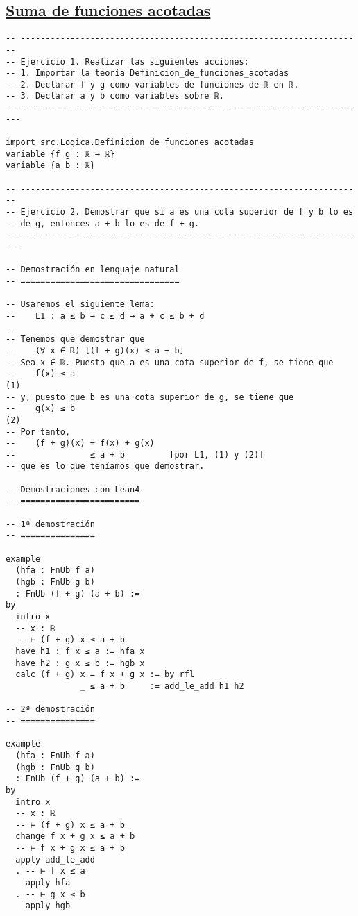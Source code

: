\subsection{\href{./src/Logica/Suma\_de\_funciones\_acotadas.lean}{Suma de funciones acotadas}}
\label{sec:orgdd76320}
\begin{verbatim}
-- ---------------------------------------------------------------------
-- Ejercicio 1. Realizar las siguientes acciones:
-- 1. Importar la teoría Definicion_de_funciones_acotadas
-- 2. Declarar f y g como variables de funciones de ℝ en ℝ.
-- 3. Declarar a y b como variables sobre ℝ.
-- ----------------------------------------------------------------------

import src.Logica.Definicion_de_funciones_acotadas
variable {f g : ℝ → ℝ}
variable {a b : ℝ}

-- ---------------------------------------------------------------------
-- Ejercicio 2. Demostrar que si a es una cota superior de f y b lo es
-- de g, entonces a + b lo es de f + g.
-- ----------------------------------------------------------------------

-- Demostración en lenguaje natural
-- ================================

-- Usaremos el siguiente lema:
--    L1 : a ≤ b → c ≤ d → a + c ≤ b + d
--
-- Tenemos que demostrar que
--    (∀ x ∈ ℝ) [(f + g)(x) ≤ a + b]
-- Sea x ∈ ℝ. Puesto que a es una cota superior de f, se tiene que
--    f(x) ≤ a                                                       (1)
-- y, puesto que b es una cota superior de g, se tiene que
--    g(x) ≤ b                                                       (2)
-- Por tanto,
--    (f + g)(x) = f(x) + g(x)
--               ≤ a + b         [por L1, (1) y (2)]
-- que es lo que teníamos que demostrar.

-- Demostraciones con Lean4
-- ========================

-- 1ª demostración
-- ===============

example
  (hfa : FnUb f a)
  (hgb : FnUb g b)
  : FnUb (f + g) (a + b) :=
by
  intro x
  -- x : ℝ
  -- ⊢ (f + g) x ≤ a + b
  have h1 : f x ≤ a := hfa x
  have h2 : g x ≤ b := hgb x
  calc (f + g) x = f x + g x := by rfl
               _ ≤ a + b     := add_le_add h1 h2

-- 2ª demostración
-- ===============

example
  (hfa : FnUb f a)
  (hgb : FnUb g b)
  : FnUb (f + g) (a + b) :=
by
  intro x
  -- x : ℝ
  -- ⊢ (f + g) x ≤ a + b
  change f x + g x ≤ a + b
  -- ⊢ f x + g x ≤ a + b
  apply add_le_add
  . -- ⊢ f x ≤ a
    apply hfa
  . -- ⊢ g x ≤ b
    apply hgb


\end{verbatim}
